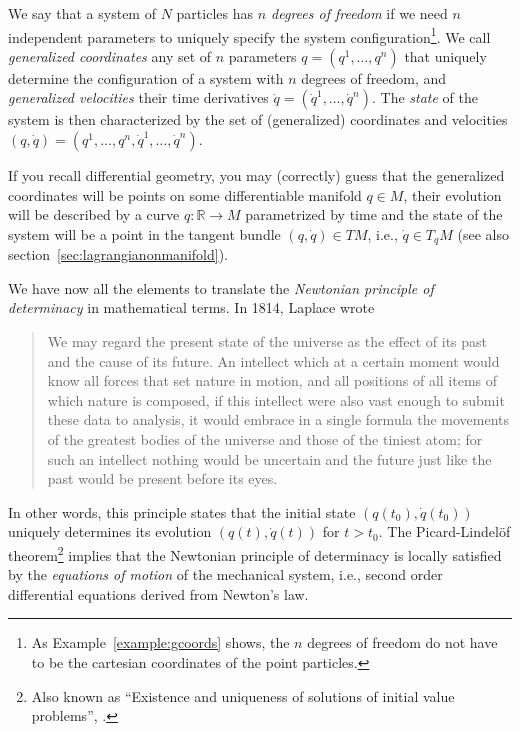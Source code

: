 \documentclass[english,fontsize=11pt,paper=a5,oneside]{scrbook}
\newcommand{\R}{\mathbb{R}}
\theoremstyle{definition}
\begin{document}
We say that a system of $N$ particles has \emph{$n$ degrees of freedom} if we need $n$ independent parameters to uniquely specify the system configuration\footnote{As Example~\ref{example:gcoords} shows, the $n$ degrees of freedom do not have to be the cartesian coordinates of the point particles.}. We call \emph{generalized coordinates} any set of $n$ parameters $q = (q^1, \ldots, q^n)$ that uniquely determine the configuration of a system with $n$ degrees of freedom, and \emph{generalized velocities} their time derivatives $\dot q = (\dot q^1, \ldots, \dot q^n)$. The \emph{state} of the system is then characterized by the set of (generalized) coordinates and velocities $(q, \dot q) = \left(q^1, \ldots, q^n,\dot q^1, \ldots, \dot q^n\right)$.

If you recall differential geometry, you may (correctly) guess that the generalized coordinates will be points on some differentiable manifold $q\in M$, their evolution will be described by a curve $q: \R \to M$ parametrized by time and the state of the system will be a point in the tangent bundle $(q, \dot q)\in TM$, i.e., $\dot q \in T_q M$ (see also section~\ref{sec:lagrangianonmanifold}).
\medskip

We have now all the elements to translate the \emph{Newtonian principle of determinacy} in mathematical terms.
In 1814, Laplace \cite{book:laplace} wrote

\begin{quotation}
  We may regard the present state of the universe as the effect of its past and the cause of its future. An intellect which at a certain moment would know all forces that set nature in motion, and all positions of all items of which nature is composed, if this intellect were also vast enough to submit these data to analysis, it would embrace in a single formula the movements of the greatest bodies of the universe and those of the tiniest atom; for such an intellect nothing would be uncertain and the future just like the past would be present before its eyes.
\end{quotation}

In other words, this principle states that the initial state $\left(q(t_0), \dot q(t_0)\right)$ uniquely determines its evolution $\left(q(t),\dot q(t)\right)$ for $t > t_0$.
The Picard-Lindel\"of theorem\footnote{Also known as ``Existence and uniqueness of solutions of initial value problems'', \cite[Theorem 3.17]{book:knauf}.} implies that the Newtonian principle of determinacy is locally satisfied by the \emph{equations of motion} of the mechanical system, i.e., second order differential equations derived from Newton's law.
\end{document}

